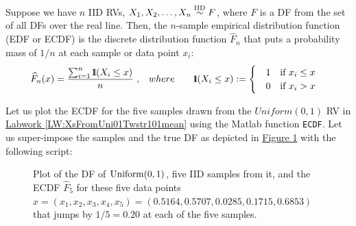\begin{definition}\label{D:ECDF}
Suppose we have $n$ IID RVs, $X_1,X_2,\ldots,X_n \overset{{\rm IID}}{\sim} F$, where $F$ is a DF from the set of all DFs over the real line.  Then, the $n$-sample empirical distribution function (EDF or ECDF) is the discrete  distribution function $\widehat{F}_n$ that puts a probability mass of $1/n$ at each sample or data point $x_i$:
\begin{eqnarray} \label{E:ECDF}
\widehat{F}_n(x) = \frac{ \sum_{i=1}^n \BB{1}(X_i \leq x) }{n} \ ,  & \quad where \qquad
\BB{1}(X_i \leq x) :=
\begin{cases}
& 1  \quad \text{if $x_i \leq x$} \\
& 0  \quad \text{if $x_i > x$}
\end{cases}
\end{eqnarray}
\end{definition}

\begin{labwork}\label{LW:ECDF}
Let us plot the ECDF for the five samples drawn from the $Uniform(0,1)$ RV in \hyperref[LW:XsFromUni01Twstr101mean]{Labwork \ref*{LW:XsFromUni01Twstr101mean}} using the {\sc Matlab} function {\tt ECDF}. %
Let us super-impose the samples and the true DF as depicted in \hyperref[F:plotUniform01ECDF5]{Figure \ref*{F:plotUniform01ECDF5}} with the following script:
{}

\begin{figure}[htpb]
\caption{Plot of the DF of $\mbox{{\rm Uniform}}(0,1)$, five IID samples from it, and the ECDF $\widehat{F}_5$ for these five data points $x=(x_1,x_2,x_3,x_4,x_5)=(0.5164,    0.5707,    0.0285,    0.1715,    0.6853)$ that jumps by $1/5=0.20$ at each of the five samples.\label{F:plotUniform01ECDF5}}
\centering   {}
\end{figure}
\end{labwork}


